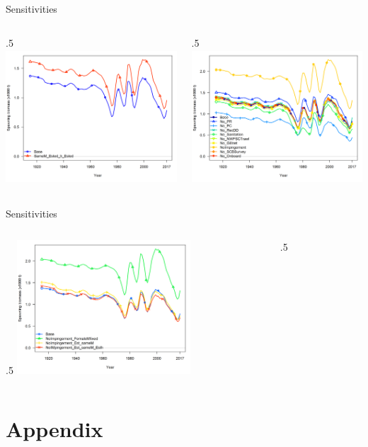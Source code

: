 \documentclass[ignorenonframetext,]{beamer}
\def\begincols{\begin{columns}}
\def\begincol{\begin{column}}
\def\endcol{\end{column}}
\def\endcols{\end{columns}}
\begin{document}
\begin{frame}{Sensitivities}

\begincols
 \begincol{.5\textwidth}
\includegraphics[height=5cm]{Figures/sensitivity_spawnbio.png} \endcol
 \begincol{.5\textwidth}
\includegraphics[height=5cm]{Figures/sensitivity1_spawnbio.png}\\
\endcol
\endcols

\end{frame}

\begin{frame}{Sensitivities}

\begincols
 \begincol{.5\textwidth}
\includegraphics[height=5cm]{Figures/sensitivity2_spawnbio.png} \endcol
 \begincol{.5\textwidth}

\endcol
\endcols

\end{frame}

\section{Appendix}\label{appendix}
\end{document}
